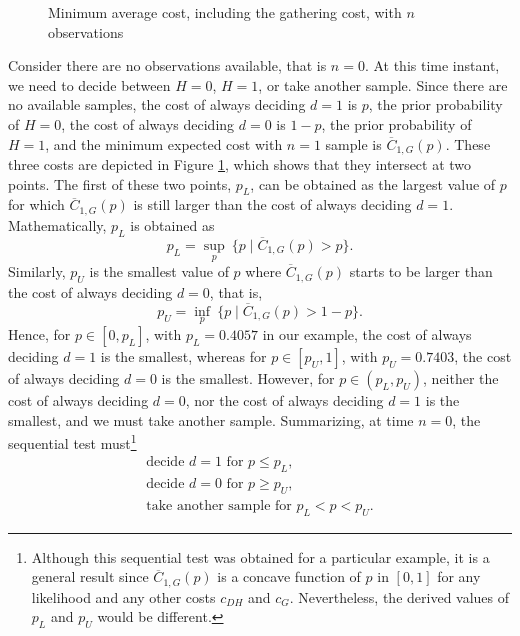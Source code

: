 \begin{figure}[t]
	\begin{center}
		
	\end{center}
	\caption{Minimum average cost, including the gathering cost, with $n$ observations}
	\label{fig:average_cost3_n}
\end{figure}

Consider there are no observations available, that is $n = 0$. At this time instant, we need to decide between $H = 0$, $H = 1$, or take another sample. Since there are no available samples, the cost of always deciding $d = 1$ is $p$, the prior probability of $H = 0$, the cost of always deciding $d = 0$ is $1 - p$, the prior probability of $H = 1$, and the minimum expected cost with $n = 1$ sample is $\overline{C}_{1,G}(p)$. These three costs are depicted in Figure \ref{fig:average_cost3_n}, which shows that they intersect at two points. The first of these two points, $p_L$, can be obtained as the largest value of $p$ for which $\overline{C}_{1,G}(p)$ is still larger than the cost of always deciding $d = 1$. Mathematically, $p_L$ is obtained as
\begin{equation*}
	p_L = \sup_{p} \ \{p \mid \overline{C}_{1,G}(p) > p\}.
\end{equation*}
Similarly, $p_U$ is the smallest value of $p$ where $\overline{C}_{1,G}(p)$ starts to be larger than the cost of always deciding $d = 0$, that is,
\begin{equation*}
	p_U = \inf_{p} \  \{p \mid \overline{C}_{1,G}(p) > 1 - p\}.
\end{equation*}
Hence, for $p \in [0,p_L]$, with $p_L = 0.4057$ in our example, the cost of always deciding $d = 1$ is the smallest, whereas for $p \in [p_U,1]$, with $p_U = 0.7403$, the cost of always deciding $d = 0$ is the smallest. However, for $p \in (p_L,p_U)$, neither the cost of always deciding $d = 0$, nor the cost of always deciding $d = 1$ is the smallest, and we must take another sample. Summarizing, at time $n = 0$, the sequential test must\footnote{Although this sequential test was obtained for a particular example, it is a general result since $\overline{C}_{1,G}(p)$ is a concave function of $p$ in $[0,1]$ for any likelihood and any other costs $c_{DH}$ and $c_{G}$. Nevertheless, the derived values of $p_L$ and $p_U$ would be different.}
\begin{equation}
\label{eq:seq_test_n0}
\begin{array}{l}
	\text{decide } d = 1 \text{ for } p \leq p_L, \\
	\text{decide } d = 0 \text{ for } p \geq p_U, \\
	\text{take another sample for } p_L < p < p_U.
\end{array}
\end{equation}

